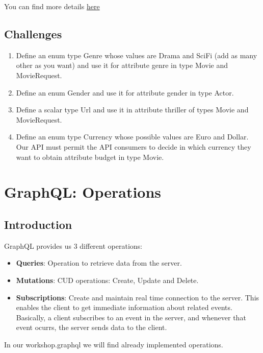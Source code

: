 \documentclass[]{book}
\providecommand{\tightlist}{%
  \setlength{\itemsep}{0pt}\setlength{\parskip}{0pt}}
\begin{document}
You can find more details
\href{https://graphql.org/graphql-js/type/\#graphqlscalartype}{here}

\section{Challenges}\label{challenges-1}

\begin{enumerate}
\def\labelenumi{\arabic{enumi}.}
\tightlist
\item
  Define an enum type Genre whose values are Drama and SciFi (add as
  many other as you want) and use it for attribute genre in type Movie
  and MovieRequest.
\item
  Define an enum Gender and use it for attribute gender in type Actor.
\item
  Define a scalar type Url and use it in attribute thriller of types
  Movie and MovieRequest.
\item
  Define an enum type Currency whose possible values are Euro and
  Dollar. Our API must permit the API consumers to decide in which
  currency they want to obtain attribute budget in type Movie.
\end{enumerate}

\chapter{GraphQL: Operations}\label{graphql-operations}

\section{Introduction}\label{introduction-2}

GraphQL provides us 3 different operations:

\begin{itemize}
\tightlist
\item
  \textbf{Queries}: Operation to retrieve data from the server.
\item
  \textbf{Mutations}: CUD operations: Create, Update and Delete.
\item
  \textbf{Subscriptions}: Create and maintain real time connection to
  the server. This enables the client to get immediate information about
  related events. Basically, a client subscribes to an event in the
  server, and whenever that event ocurrs, the server sends data to the
  client.
\end{itemize}

In our workshop.graphql we will find already implemented operations.
\end{document}
